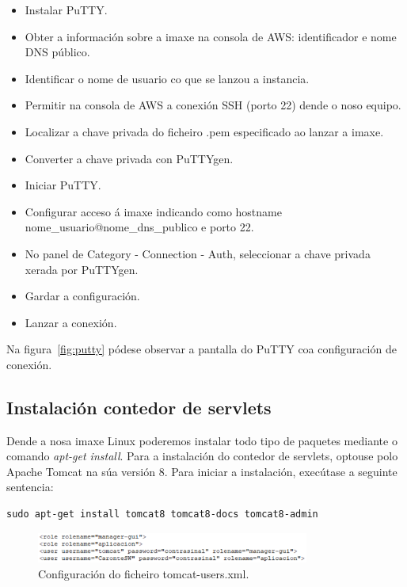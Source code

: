 \begin{itemize}
	\item Instalar PuTTY.
	\item Obter a información sobre a imaxe na consola de AWS: identificador e nome DNS público.
	\item Identificar o nome de usuario co que se lanzou a instancia.
	\item Permitir na consola de AWS a conexión SSH (porto 22) dende o noso equipo.
	\item Localizar a chave privada do ficheiro .pem especificado ao lanzar a imaxe.
	\item Converter a chave privada con PuTTYgen.
	\item Iniciar PuTTY.
	\item Configurar acceso á imaxe indicando como hostname nome\_usuario@nome\_dns\_publico e porto 22.
	\item No panel de Category - Connection - Auth, seleccionar a chave privada xerada por PuTTYgen.
	\item Gardar a configuración.
	\item Lanzar a conexión.
\end{itemize}

Na figura~\ref{fig:putty} pódese observar a pantalla do PuTTY coa configuración de conexión.

\subsection{Instalación contedor de servlets}
Dende a nosa imaxe Linux poderemos instalar todo tipo de paquetes mediante o comando \emph{apt-get install}. Para a instalación do contedor de servlets, optouse polo Apache Tomcat na súa versión 8. Para iniciar a instalación, execútase a seguinte sentencia:

\begin{lstlisting}
sudo apt-get install tomcat8 tomcat8-docs tomcat8-admin
\end{lstlisting}

\begin{figure}[h]
	\begin{center}
		\includegraphics[width=0.8\textwidth]{figures/capturas/tomcatUsers}
		\caption{Configuración do ficheiro tomcat-users.xml.}
		\label{fig:tomcatUsers}
	\end{center}
\end{figure}


